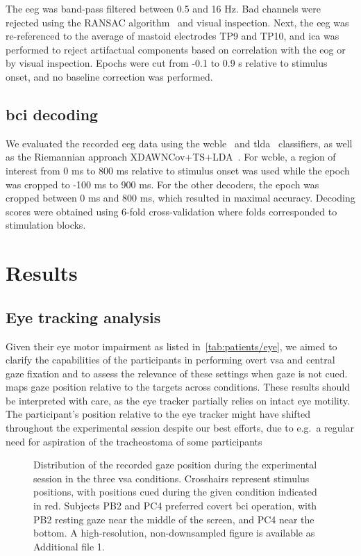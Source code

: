 \documentclass{article}
\begin{document}
The \ac{eeg} was band-pass filtered between 0.5 and 16 Hz.
Bad channels were rejected using the RANSAC algorithm~\cite{Fischler1981}
and visual inspection.
Next, the \ac{eeg} was re-referenced to the average of mastoid electrodes TP9
and TP10, and \ac{ica} was performed to reject artifactual components based on
correlation with the \ac{eog} or by visual inspection.
Epochs were cut from -0.1 to 0.9 s relative to stimulus onset, and no baseline
correction was performed.

\subsection{\Acs{bci} decoding}

We evaluated the recorded \ac{eeg} data using the \ac{wcble}~\cite{VanDenKerchove2024}
and \ac{tlda}~\cite{Sosulski2022}
classifiers, as well as the Riemannian approach XDAWNCov+TS+LDA~\cite{Cecotti2017}.
For \ac{wcble}, a region of interest from 0 ms to 800 ms relative to stimulus
onset was used while the epoch was cropped to -100 ms to 900 ms. For the other
decoders, the epoch was cropped between 0 ms and 800 ms, which resulted in maximal
accuracy.
Decoding scores were obtained using 6-fold cross-validation where folds corresponded to
stimulation blocks.

\section{Results}



\subsection{Eye tracking analysis}
\label{sec:patients/outcomes/gaze}
Given their eye motor impairment as listed in~\cref{tab:patients/eye}, we aimed to clarify the
capabilities of the participants in performing overt \ac{vsa} and central gaze fixation and to
assess the relevance of these settings when gaze is not cued.
 maps gaze position relative to the targets
across conditions.
These results should be interpreted with care, as the eye tracker partially
relies on intact eye motility.
The participant's position relative to the eye tracker might have shifted
throughout the experimental session despite our best efforts, due to e.g.\ a
regular need for aspiration of the tracheostoma of some participants
\begin{figure}
	\caption{%
		Distribution of the recorded gaze position during the experimental session in the three \ac{vsa}
		conditions.
		Crosshairs represent stimulus positions, with positions cued during
		the given condition indicated in red.
		Subjects PB2 and PC4 preferred covert \ac{bci} operation, with PB2 resting gaze
		near the middle of the screen, and PC4 near the bottom.
		A high-resolution, non-downsampled figure is available as Additional file 1.
	}%
	\label{fig:patients/gaze}
\end{figure}
\end{document}

